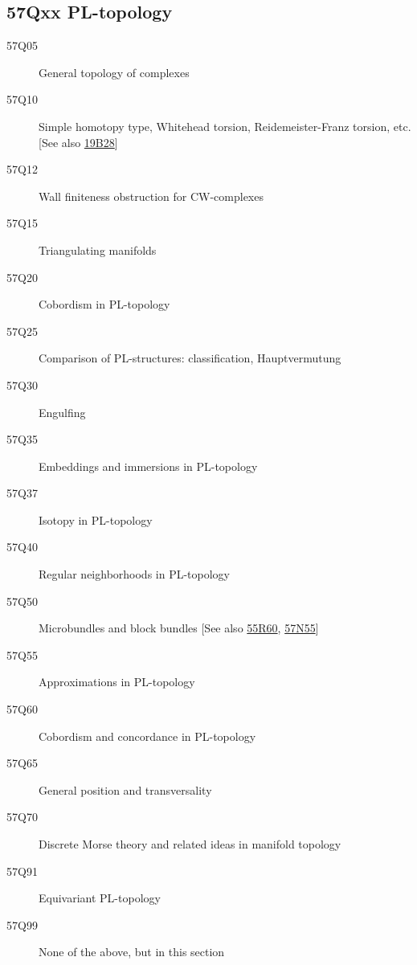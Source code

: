 \subsection*{57Qxx  PL-topology }\label{57Qxx}
\begin{description}  
\item [57Q05]\label{57Q05} General topology of complexes
\item [57Q10]\label{57Q10} Simple homotopy type, Whitehead torsion, Reidemeister-Franz torsion, etc. [See also \hyperref[19B28]{19B28}]
\item [57Q12]\label{57Q12} Wall finiteness obstruction for CW-complexes
\item [57Q15]\label{57Q15} Triangulating manifolds
\item [57Q20]\label{57Q20} Cobordism in PL-topology
\item [57Q25]\label{57Q25} Comparison of PL-structures: classification, Hauptvermutung
\item [57Q30]\label{57Q30} Engulfing 
\item [57Q35]\label{57Q35} Embeddings and immersions  in PL-topology
\item [57Q37]\label{57Q37} Isotopy  in PL-topology
\item [57Q40]\label{57Q40} Regular neighborhoods  in PL-topology
\item [57Q50]\label{57Q50} Microbundles and block bundles [See also \hyperref[55R60]{55R60}, \hyperref[57N55]{57N55}]
\item [57Q55]\label{57Q55} Approximations  in PL-topology
\item [57Q60]\label{57Q60} Cobordism and concordance  in PL-topology
\item [57Q65]\label{57Q65} General position and transversality
\item [57Q70]\label{57Q70} Discrete Morse theory and related ideas in manifold topology
\item [57Q91]\label{57Q91} Equivariant PL-topology
\item [57Q99]\label{57Q99} None of the above, but in this section
\end{description}
